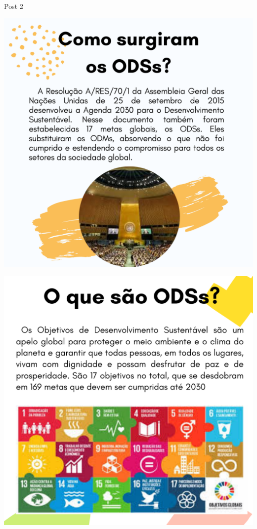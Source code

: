 \documentclass{beamer}
\begin{document}
	\begin{frame}{Post 2}
		\begin{minipage}{0.49\linewidth}
			\centering
			\includegraphics[width=\linewidth]{Post 2/3.png}
		\end{minipage}
		\hfill
		\begin{minipage}{0.49\linewidth}
			\centering
			\includegraphics[width=\linewidth]{Post 2/4.png}
		\end{minipage}
	\end{frame}
\end{document}
